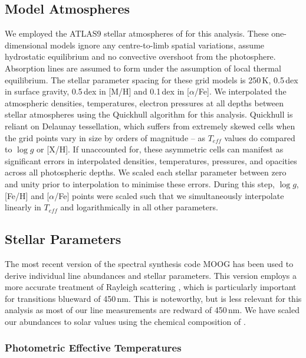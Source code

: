 \documentclass{emulateapj}
\begin{document}

\subsection{Model Atmospheres}
We employed the ATLAS9 stellar atmospheres of \citet{Castelli;Kurucz_2003} for this analysis. These one-dimensional models ignore any centre-to-limb spatial variations, assume hydrostatic equilibrium and no convective overshoot from the photosphere. Absorption lines are assumed to form under the assumption of local thermal equilibrium. The stellar parameter spacing for these grid models is 250\,K, 0.5\,dex in surface gravity, 0.5\,dex in [M/H] and 0.1\,dex in [$\alpha$/Fe]. We interpolated the atmospheric densities, temperatures, electron pressures at all depths between stellar atmospheres using the Quickhull algorithm for this analysis. Quickhull is reliant on Delaunay tessellation, which suffers from extremely skewed cells when the grid points vary in size by orders of magnitude -- as $T_{eff}$ values do compared to $\log{g}$ or [X/H]. If unaccounted for, these asymmetric cells can manifest as significant errors in interpolated densities, temperatures, pressures, and opacities across all photospheric depths. We scaled each stellar parameter between zero and unity prior to interpolation to minimise these errors. During this step, $\log{g}$, [Fe/H] and [$\alpha$/Fe] points were scaled such that we simultaneously interpolate linearly in $T_{eff}$ and logarithmically in all other parameters.

\subsection{Stellar Parameters}
The most recent version of the spectral synthesis code MOOG \citep{Sneden;et-al_1973} has been used to derive individual line abundances and stellar parameters. This version employs a more accurate treatment of Rayleigh scattering \citep{Sobeck;et-al_2011}, which is particularly important for transitions blueward of 450\,nm. This is noteworthy, but is less relevant for this analysis as most of our line measurements are redward of 450\,nm. We have scaled our abundances to solar values using the chemical composition of \citet{Asplund;et-al_2009}.


\subsubsection{Photometric Effective Temperatures}
\end{document}
